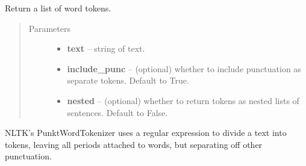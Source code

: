 \documentclass[letterpaper,10pt,english]{sphinxmanual}
\begin{document}
\begin{fulllineitems}
\begin{fulllineitems}
\end{fulllineitems}


\begin{fulllineitems}
\label{api_reference:textblob_de.tokenizers.NLTKPunktTokenizer.tokenize}
Return a list of word tokens.
\begin{quote}\begin{description}
\item[{Parameters}] \leavevmode\begin{itemize}
\item {} 
\textbf{text} -- string of text.

\item {} 
\textbf{include\_punc} -- (optional) whether to include punctuation as separate
tokens. Default to True.

\item {} 
\textbf{nested} -- (optional) whether to return tokens as nested lists of
sentences. Default to False.

\end{itemize}

\end{description}\end{quote}

\end{fulllineitems}


\begin{fulllineitems}
\label{api_reference:textblob_de.tokenizers.NLTKPunktTokenizer.word_tokenize}
NLTK's PunktWordTokenizer uses a regular expression to divide a text
into tokens, leaving all periods attached to words, but separating off
other punctuation.

\end{fulllineitems}


\end{fulllineitems}

\end{document}
